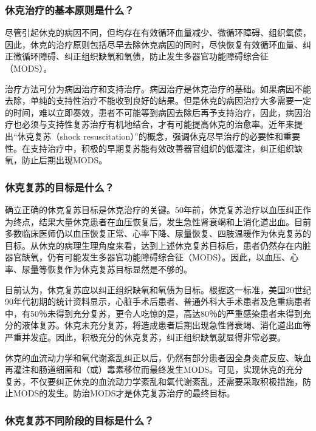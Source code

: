 \subsubsection{休克治疗的基本原则是什么？}

尽管引起休克的病因不同，但均存在有效循环血量减少、微循环障碍、组织氧债，因此，休克的治疗原则包括尽早去除休克病因的同时，尽快恢复有效循环血量、纠正微循环障碍、纠正组织缺氧和氧债，防止发生多器官功能障碍综合征（MODS）。

治疗方法可分为病因治疗和支持治疗。病因治疗是休克治疗的基础。如果病因不能去除，单纯的支持性治疗不能收到良好的结果。但是休克的病因治疗大多需要一定的时间，难以立即奏效，患者不可能等到病因去除后再予支持治疗，因此，病因治疗也必须与支持性复苏治疗有机地结合，才有可能提高休克的治愈率。近年来提出“休克复苏（shock
resuscitation）”的概念，强调休克尽早治疗的必要性和重要性。在支持治疗中，积极的早期复苏能有效改善器官组织的低灌注，纠正组织缺氧，防止后期出现MODS。

\subsubsection{休克复苏的目标是什么？}

确立正确的休克复苏目标是休克治疗的关键。50年前，休克复苏治疗以血压纠正作为终点，结果大量休克患者在血压恢复后，发生急性肾衰竭和上消化道出血。目前多数临床医师仍以血压恢复正常、心率下降、尿量恢复、四肢温暖作为休克复苏的目标。从休克的病理生理角度来看，达到上述休克复苏目标后，患者仍然存在内脏器官缺氧，仍有可能发生多器官功能障碍综合征（MODS）。因此，以血压、心率、尿量等恢复作为休克复苏目标显然是不够的。

目前认为，休克复苏应以纠正组织缺氧和氧债为目标。根据这一标准，美国20世纪90年代初期的统计资料显示，心脏手术后患者、普通外科大手术患者及危重病患者中，有50％未得到充分复苏，更令人吃惊的是，高达80％的严重感染患者未得到充分的液体复苏。休克未充分复苏，将造成患者后期出现急性肾衰竭、消化道出血等严重并发症。因此，积极充分的休克复苏，纠正组织缺氧就显得非常必要。

休克的血流动力学和氧代谢紊乱纠正以后，仍然有部分患者因全身炎症反应、缺血再灌注和肠道细菌和（或）毒素移位而最终发生MODS。可见，实现休克的充分复苏，不仅要纠正休克的血流动力学紊乱和氧代谢紊乱，还需要采取积极措施，防止MODS的发生。防治MODS才是休克复苏治疗的最终目标。

\subsubsection{休克复苏不同阶段的目标是什么？}

